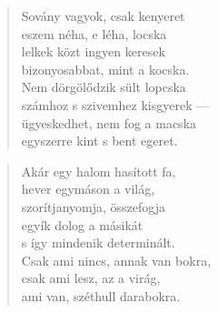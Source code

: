 \newpage


\vspace*{-15mm}
\centeredornament




\begin{verse}
  Sovány vagyok, csak kenyeret \\
  eszem néha, e léha, locska \\
  lelkek közt ingyen keresek \\
  bizonyosabbat, mint a kocska. \\
  Nem dörgölődzik sült lopcska \\
  számhoz s szivemhez kisgyerek --- \\
  ügyeskedhet, nem fog a macska \\
  egyszerre kint s bent egeret.
\end{verse}

\bigskip



\begin{verse}
  Akár egy halom hasított fa, \\
  hever egymáson a világ, \\
  szorítjanyomja, összefogja \\
  egyík dolog a másikát \\
  s így mindenik determinált. \\
  Csak ami nincs, annak van bokra, \\
  csak ami lesz, az a virág, \\
  ami van, széthull darabokra.
\end{verse}

\newpage


\vspace*{-15mm}
\centeredornament

